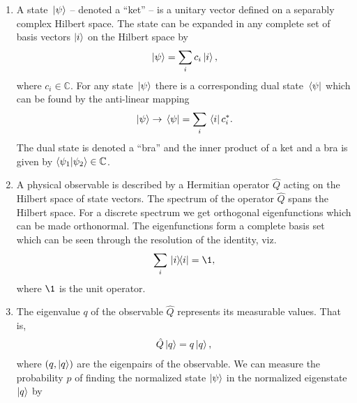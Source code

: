         \begin{enumerate}
            \item A state $\ket*{\psi}$ -- denoted a ``ket'' \cite{dirac_1939}
                -- is a unitary vector defined on a separably complex Hilbert
                space.
                The state can be expanded in any complete set of basis vectors
                $\ket{i}$ on the Hilbert space by
                \begin{align}
                    \ket*{\psi} = \sum_{i}c_i\ket*{i},
                \end{align}
                where $c_i \in \mathbb{C}$.
                For any state $\ket*{\psi}$ there is a corresponding dual state
                $\bra*{\psi}$ which can be found by the anti-linear mapping
                \begin{align}
                    \ket*{\psi}
                    \to \bra*{\psi}
                    = \sum_{i}\bra*{i} c^{*}_i.
                \end{align}
                The dual state is denoted a ``bra'' and the inner product of a
                ket and a bra is given by $\braket{\psi_1}{\psi_2} \in
                \mathbb{C}$.
            \item A physical observable is described by a Hermitian operator
                $\hat{Q}$ acting on the Hilbert space of state vectors.
                The spectrum of the operator $\hat{Q}$ spans the Hilbert space.
                For a discrete spectrum we get orthogonal eigenfunctions which
                can be made orthonormal.
                The eigenfunctions form a complete basis set which can be seen
                through the resolution of the identity, viz.
                \begin{align}
                    \sum_{i}\dyad*{i} = \1,
                \end{align}
                where $\1$ is the unit operator.
            \item The eigenvalue $q$ of the observable $\hat{Q}$ represents its
                measurable values.
                That is,
                \begin{align}
                    \hat{Q}\ket{q} = q\ket{q},
                \end{align}
                where $(q, \ket{q})$ are the eigenpairs of the observable.
                We can measure the probability $p$ of finding the normalized
                state $\ket{\psi}$ in the normalized eigenstate $\ket{q}$ by
                \begin{align}

\end{align}
\end{enumerate}
